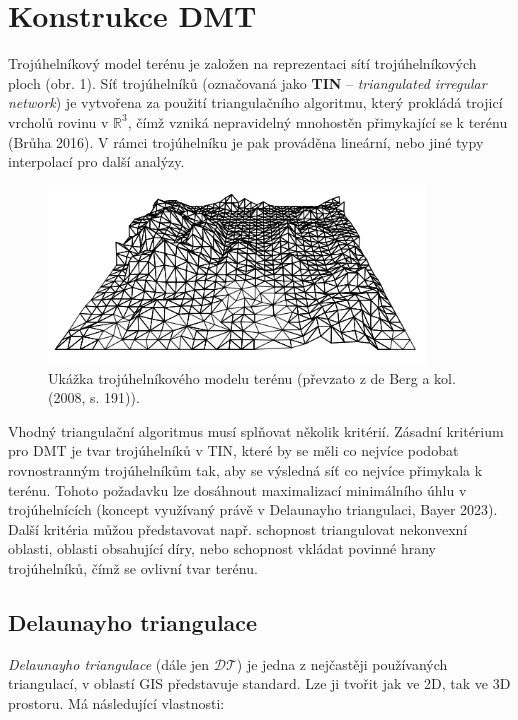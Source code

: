 \section*{Konstrukce DMT}
\par Trojúhelníkový model terénu je založen na reprezentaci sítí trojúhelníkových ploch (obr. 1). Síť trojúhelníků (označovaná jako \textbf{TIN} – \emph{triangulated irregular network}) je vytvořena za použití triangulačního algoritmu, který prokládá trojicí vrcholů rovinu v $\mathbb{R}^3$, čímž vzniká nepravidelný mnohostěn přimykající se k terénu (Brůha 2016). V rámci trojúhelníku je pak prováděna lineární, nebo jiné typy interpolací pro další analýzy.

\begin{figure}[H]
\centering
\includegraphics[width=10cm]{images/tin.png} 
    \caption{Ukážka trojúhelníkového modelu terénu (převzato z de Berg a kol. (2008, s. 191)).}
\end{figure}


\par Vhodný triangulační algoritmus musí splňovat několik kritérií. Zásadní kritérium pro DMT je tvar trojúhelníků v TIN, které by se měli co nejvíce podobat rovnostranným trojúhelníkům tak, aby se výsledná síť co nejvíce přimykala k terénu. Tohoto požadavku lze dosáhnout maximalizací minimálního úhlu v trojúhelnících (koncept využívaný právě v Delaunayho triangulaci, Bayer 2023). Další kritéria můžou představovat např. schopnost triangulovat nekonvexní oblasti, oblasti obsahující díry, nebo schopnost vkládat povinné hrany trojúhelníků, čímž se ovlivní tvar terénu. 
\bigbreak

\subsection*{Delaunayho triangulace}
\par \emph{Delaunayho triangulace} (dále jen $\mathcal{DT}$) je jedna z nejčastěji používaných triangulací, v oblastí GIS představuje standard. Lze ji tvořit jak ve 2D, tak ve 3D prostoru. Má následující vlastnosti:

